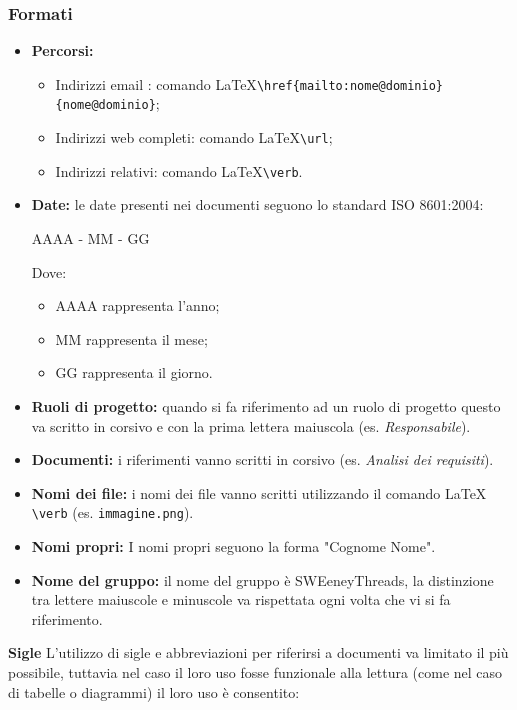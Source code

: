 \documentclass[a4paper]{article}
\begin{document}
		\subsubsection{Formati}
		\begin{itemize}
			\item \textbf{Percorsi:}
			\begin{itemize}
				\item Indirizzi email : comando \LaTeX \space \verb|\href{mailto:nome@dominio}{nome@dominio}|;
				\item Indirizzi web completi: comando \LaTeX \space \verb|\url|;
				\item Indirizzi relativi: comando \LaTeX  \space \verb|\verb|.
			\end{itemize}
			\item \textbf{Date:} le date presenti nei documenti seguono lo standard ISO 8601:2004:
			\begin{center}
				AAAA - MM - GG
			\end{center}
			Dove:
			\begin{itemize}
				\item AAAA rappresenta l'anno;
				\item MM rappresenta il mese;
				\item GG rappresenta il giorno.
			\end{itemize}
			\item \textbf{Ruoli di progetto:} quando si fa riferimento ad un ruolo di progetto questo va scritto in corsivo
			e con la prima lettera maiuscola (es. \textit{Responsabile}).
			\item \textbf{Documenti:} i riferimenti vanno scritti in corsivo (es. \textit{Analisi dei requisiti}).
			\item \textbf{Nomi dei file:} i nomi dei file vanno scritti utilizzando il comando \LaTeX \space
			\verb|\verb| (es. \verb|immagine.png|).
			\item \textbf{Nomi propri:} I nomi propri seguono la forma "Cognome Nome".
			\item \textbf{Nome del gruppo:} il nome del gruppo è SWEeneyThreads, la distinzione tra lettere maiuscole e
			minuscole va rispettata ogni volta che vi si fa riferimento.
		\end{itemize}
		\textbf{Sigle}
		L'utilizzo di sigle e abbreviazioni per riferirsi a documenti va limitato il più possibile, tuttavia nel caso il loro uso
		fosse funzionale alla lettura (come nel caso di tabelle o diagrammi) il loro uso è consentito:
\end{document}
